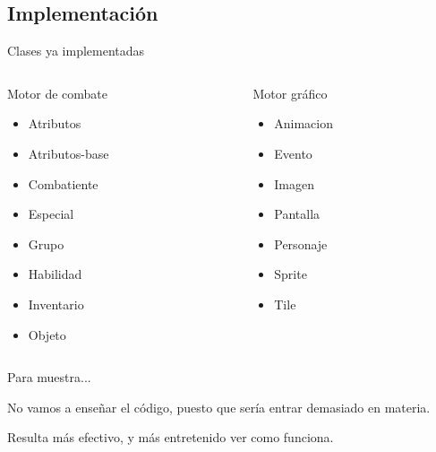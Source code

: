 \documentclass[9pt,xcolor=svgnames]{beamer}
\begin{document}
    
  \subsection{Implementación}
  
  \begin{frame}{Clases ya implementadas}
   
    \begin{columns}
     
     \begin{column}{3cm}
      \begin{block}{Motor de combate}
       \begin{itemize}
	\item Atributos
	\item Atributos-base
	\item Combatiente
	\item Especial
	\item Grupo
	\item Habilidad
	\item Inventario
	\item Objeto      
       \end{itemize}
      \end{block}
     \end{column}
     
     \begin{column}{3cm}
      \begin{block}{Motor gráfico}
       \begin{itemize}
	\item Animacion
	\item Evento
	\item Imagen
	\item Pantalla
	\item Personaje
	\item Sprite
	\item Tile
       \end{itemize}
      \end{block}
     \end{column}
     
    \end{columns}
  \end{frame}
  
  \begin{frame}{Para muestra...}
   
   No vamos a enseñar el código, puesto que sería entrar demasiado en
   materia.\\
   \vspace*{0.5cm}
   
   Resulta más efectivo, y más entretenido ver como funciona.
   
  \end{frame}
  
\end{document}
